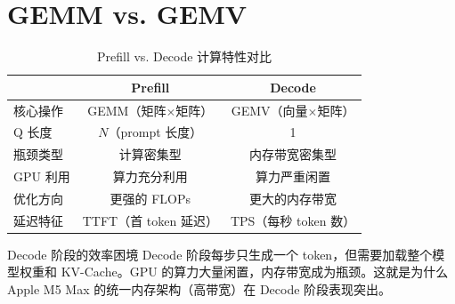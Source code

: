 \section{GEMM vs. GEMV}

\begin{table}[H]
\centering
\caption{Prefill vs. Decode 计算特性对比}
\begin{tabular}{lcc}
\toprule
& \textbf{Prefill} & \textbf{Decode} \\
\midrule
核心操作 & GEMM（矩阵$\times$矩阵） & GEMV（向量$\times$矩阵） \\
Q 长度 & $N$（prompt 长度） & 1 \\
瓶颈类型 & 计算密集型 & 内存带宽密集型 \\
GPU 利用 & 算力充分利用 & 算力严重闲置 \\
优化方向 & 更强的 FLOPs & 更大的内存带宽 \\
延迟特征 & TTFT（首 token 延迟） & TPS（每秒 token 数） \\
\bottomrule
\end{tabular}
\end{table}

\begin{warningbox}{Decode 阶段的效率困境}
Decode 阶段每步只生成一个 token，但需要加载整个模型权重和 KV-Cache。GPU 的算力大量闲置，内存带宽成为瓶颈。这就是为什么 Apple M5 Max 的统一内存架构（高带宽）在 Decode 阶段表现突出。
\end{warningbox}

